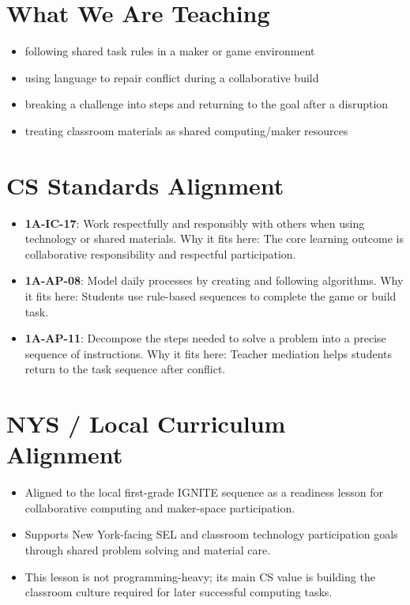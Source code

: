 \documentclass[11pt]{article}
\begin{document}
\section*{What We Are Teaching}
\begin{itemize}[leftmargin=*]
\item following shared task rules in a maker or game environment
\item using language to repair conflict during a collaborative build
\item breaking a challenge into steps and returning to the goal after a disruption
\item treating classroom materials as shared computing/maker resources
\end{itemize}

\section*{CS Standards Alignment}
\begin{itemize}[leftmargin=*]
\item \textbf{1A-IC-17}: Work respectfully and responsibly with others when using technology or shared materials. Why it fits here: The core learning outcome is collaborative responsibility and respectful participation.
\item \textbf{1A-AP-08}: Model daily processes by creating and following algorithms. Why it fits here: Students use rule-based sequences to complete the game or build task.
\item \textbf{1A-AP-11}: Decompose the steps needed to solve a problem into a precise sequence of instructions. Why it fits here: Teacher mediation helps students return to the task sequence after conflict.
\end{itemize}

\section*{NYS / Local Curriculum Alignment}
\begin{itemize}[leftmargin=*]
\item Aligned to the local first-grade IGNITE sequence as a readiness lesson for collaborative computing and maker-space participation.
\item Supports New York-facing SEL and classroom technology participation goals through shared problem solving and material care.
\item This lesson is not programming-heavy; its main CS value is building the classroom culture required for later successful computing tasks.
\end{itemize}
\end{document}
